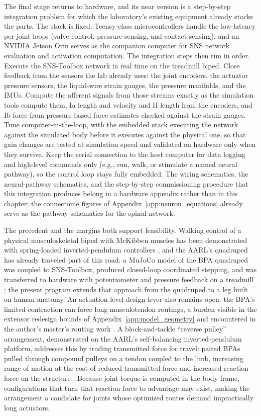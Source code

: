 The final stage returns to hardware, and its near version is a step-by-step integration problem for which the laboratory's existing equipment already stocks the parts. The stack is fixed: Teensy-class microcontrollers handle the low-latency per-joint loops (valve control, pressure sensing, and contact sensing), and an NVIDIA Jetson Orin serves as the companion computer for SNS network evaluation and activation computation. The integration steps then run in order. Execute the SNS-Toolbox network in real time on the treadmill biped. Close feedback from the sensors the lab already uses: the joint encoders, the actuator pressure sensors, the liquid-wire strain gauges, the pressure manifolds, and the IMUs. Compute the afferent signals from those streams exactly as the simulation tools compute them, Ia length and velocity and II length from the encoders, and Ib force from pressure-based force estimates checked against the strain gauges. Tune computer-in-the-loop, with the embedded stack executing the network against the simulated body before it executes against the physical one, so that gain changes are tested at simulation speed and validated on hardware only when they survive. Keep the serial connection to the host computer for data logging and high-level commands only (e.g., run, walk, or stimulate a named neural pathway), so the control loop stays fully embedded. The wiring schematics, the neural-pathway schematics, and the step-by-step commissioning procedure that this integration produces belong in a hardware appendix rather than in this chapter; the connectome figures of Appendix~\ref{app:neuron_equations} already serve as the pathway schematics for the spinal network.

The precedent and the margins both support feasibility. Walking control of a physical musculoskeletal biped with McKibben muscles has been demonstrated with spring-loaded inverted-pendulum controllers \citep{li_controller_2024}, and the AARL's quadruped has already traveled part of this road: a MuJoCo model of the BPA quadruped was coupled to SNS-Toolbox, produced closed-loop coordinated stepping, and was transferred to hardware with potentiometer and pressure feedback on a treadmill \citep{lutz_mechanical_2025}; the present program extends that approach from the quadruped to a leg built on human anatomy. An actuation-level design lever also remains open: the BPA's limited contraction can force long musculotendon routings, a burden visible in the extensor redesign bounds of Appendix~\ref{app:model_geometry} and encountered in the author's master's routing work \citep{bolen_determination_2019}. A block-and-tackle ``reverse pulley'' arrangement, demonstrated on the AARL's self-balancing inverted-pendulum platform, addresses this by trading transmitted force for travel: paired BPAs pulled through compound pulleys on a tendon coupled to the limb, increasing range of motion at the cost of reduced transmitted force and increased reaction force on the structure \citep{bolen_balance_2024, bolen_selfbalancing_2024, bolen_selfbalancing_srs_2024}. Because joint torque is computed in the body frame, configurations that turn that reaction force to advantage may exist, making the arrangement a candidate for joints whose optimized routes demand impractically long actuators.

